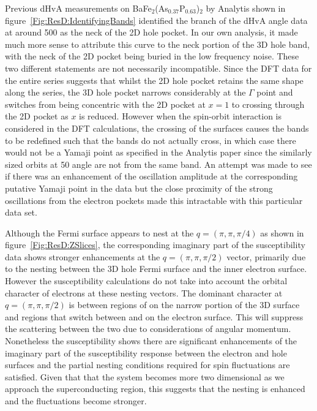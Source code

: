 Previous \ac{dHvA} measurements on BaFe$_2$(As$_{0.37}$P$_{0.63}$)$_2$ by Analytis \etal shown in figure~\ref{Fig:ResD:IdentifyingBands} identified the branch of the \ac{dHvA} angle data at around \unit{500}{\tesla} as the neck of the 2D hole pocket. In our own analysis, it made much more sense to attribute this curve to the neck portion of the 3D hole band, with the neck of the 2D pocket being buried in the low frequency noise. These two different statements are not necessarily incompatible. Since the \ac{DFT} data for the entire series suggests that whilst the 2D hole pocket retains the same shape along the \BaFePAs series, the 3D hole pocket narrows considerably at the $\Gamma$ point and switches from being concentric with the 2D pocket at $x=1$ to crossing through the 2D pocket as $x$ is reduced. However when the spin-orbit interaction is considered in the \ac{DFT} calculations, the crossing of the surfaces causes the bands to be redefined such that the bands do not actually cross, in which case there would not be a Yamaji point as specified in the Analytis paper since the similarly sized orbits at \unit{50}{\degree} angle are not from the same band. An attempt was made to see if there was an enhancement of the oscillation amplitude at the corresponding putative Yamaji point in the \BaFeP data but the close proximity of the strong oscillations from the electron pockets made this intractable with this particular data set.

Although the Fermi surface appears to nest at the $q=(\pi, \pi, \pi/4)$ as shown in figure~\ref{Fig:ResD:ZSlices}, the corresponding imaginary part of the susceptibility data shows stronger enhancements at the $q=(\pi, \pi, \pi/2)$ vector, primarily due to the nesting between the 3D hole Fermi surface and the inner electron surface. However the susceptibility calculations do not take into account the orbital character of electrons at these nesting vectors. The dominant character at $q=(\pi, \pi, \pi/2)$ is between regions of \DxzDyz on the narrow portion of the 3D surface and regions that switch between \Dxy and \DxzDyz on the electron surface. This will suppress the scattering between the two due to considerations of angular momentum. Nonetheless the susceptibility shows there are significant enhancements of the imaginary part of the susceptibility response between the electron and hole surfaces and the partial nesting conditions required for spin fluctuations are satisfied. Given that that the system becomes more two dimensional as we approach the superconducting region, this suggests that the nesting is enhanced and the fluctuations become stronger.

